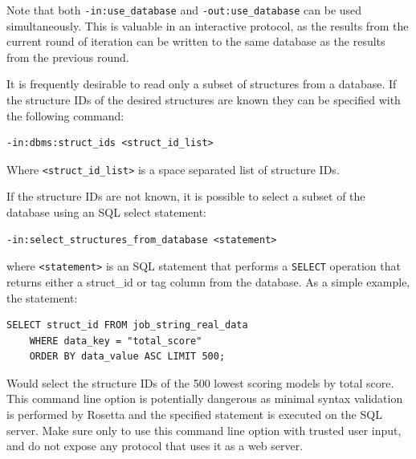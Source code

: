 Note that both \texttt{-in:use\_database} and \texttt{-out:use\_database} can be used simultaneously.
This is valuable in an interactive protocol, as the results from the current round of iteration can be written to the same database as the results from the previous round. 

It is frequently desirable to read only a subset of structures from a database. 
If the structure IDs of the desired structures are known they can be specified with the following command:

\singlespace
\begin{Verbatim}
-in:dbms:struct_ids <struct_id_list>
\end{Verbatim}
\doublespace

Where \texttt{<struct\_id\_list>} is a space separated list of structure IDs.

If the structure IDs are not known, it is possible to select a subset of the database using an \ac{SQL} select statement:

\singlespace
\begin{Verbatim}
-in:select_structures_from_database <statement>
\end{Verbatim}
\doublespace

where \texttt{<statement>} is an SQL statement that performs a \texttt{SELECT} operation that returns either a struct\_id or tag column from the database.  As a simple example, the statement:

\singlespace
\begin{Verbatim}
SELECT struct_id FROM job_string_real_data 
	WHERE data_key = "total_score" 
	ORDER BY data_value ASC LIMIT 500;
\end{Verbatim}
\doublespace

Would select the structure IDs of the 500 lowest scoring models by total score.
This command line option is potentially dangerous as minimal syntax validation is performed by Rosetta and the specified statement is executed on the \ac{SQL} server.
Make sure only to use this command line option with trusted user input, and do not expose any protocol that uses it as a web server.
